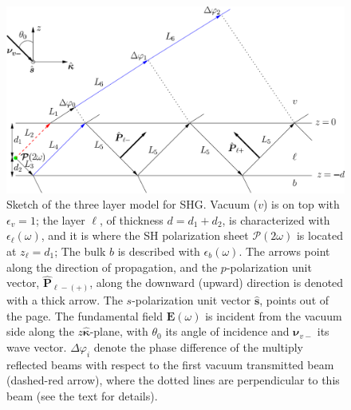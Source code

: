 \begin{figure}[t]
\centering 
\includegraphics[scale=.5]{figures/02-shgyield/multi}
\caption{Sketch of the three layer model for SHG. Vacuum ($v$) is on top with
$\epsilon_v=1$; the layer $\ell$, of thickness $d=d_1+d_2$, is characterized
with $\epsilon_{\ell}(\omega)$, and it is where the SH polarization sheet
$\boldsymbol{\mathcal{P}}(2\omega)$ is located at $z_\ell=d_1$; The bulk $b$ is
described with $\epsilon_{b}(\omega)$. The arrows point along the direction of
propagation, and the $p$-polarization unit vector, $\hat{\mathbf{P}}_{\ell -(+)}$, along
the downward (upward) direction is denoted with a thick arrow. The
$s$-polarization unit vector $\hat{\mathbf{s}}$, points out of the page. The fundamental
field $\mathbf{E}(\omega)$ is incident from the vacuum side along the
$z\hat{\boldsymbol{\kappa}}$-plane, with $\theta_{0}$ its angle of incidence and
$\boldsymbol{\nu}_{v-}$ its wave vector. $\Delta\varphi_{i}$ denote the phase
difference of the multiply reflected beams with respect to the first vacuum
transmitted beam (dashed-red arrow), where the dotted lines are perpendicular to
this beam (see the text for details).\label{3layer}}
\end{figure}

